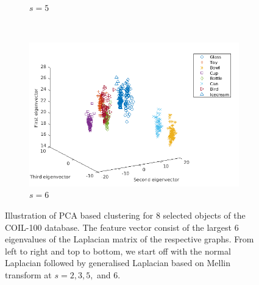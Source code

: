 \documentclass[10pt,a4paper]{article}
\theoremstyle{plain}
\theoremstyle{definition}
\begin{document}
\begin{figure}[H]
\begin{subfigure}[b]{0.5\textwidth}
		\caption{$s=5$}
		\label{}
	\end{subfigure}~
\begin{subfigure}[b]{0.5\textwidth}
	\includegraphics[width= \textwidth]{images/Mellin-s6.png}
	\caption{$s=6$}
	\label{}
\end{subfigure}
	\caption{Illustration of PCA based clustering for $8$ selected objects of the COIL-100 database. The feature vector consist of the largest $6$ eigenvalues of the Laplacian matrix of the respective graphs. From left to right and top to bottom, we start off with the normal Laplacian followed by generalised Laplacian based on Mellin transform at $s=2,3,5,$ and $6$. }
	\label{}
\end{figure}
\end{document}
